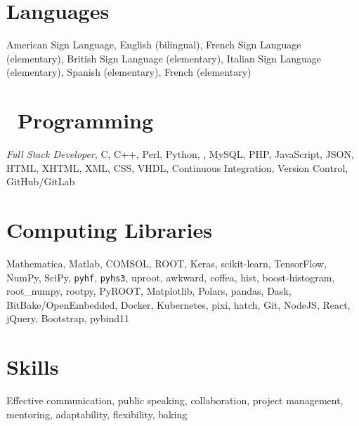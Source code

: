 \documentclass[margin,line]{resume}
\let\origsection\section%
\let\section\subsection%
\let\section\origsection%
\begin{document}
\begin{resume}
\section{\mysidestyle Languages}

American Sign Language, English (bilingual), French Sign Language (elementary), British Sign Language (elementary), Italian Sign Language (elementary), Spanish (elementary), French (elementary)

\section{\mysidestyle {}~Programming}

\textsl{Full Stack Developer}, C, C++, Perl, Python, \LaTeXe, MySQL, PHP, JavaScript, JSON, HTML, XHTML, XML, CSS, VHDL, Continuous Integration, Version Control, GitHub/GitLab

\section{\mysidestyle Computing Libraries}

Mathematica, Matlab, COMSOL, ROOT, Keras, scikit-learn, TensorFlow, NumPy, SciPy, \texttt{pyhf}, \texttt{pyhs3}, uproot, awkward, coffea, hist, boost-histogram, root\_numpy, rootpy, PyROOT, Matplotlib, Polars, pandas, Dask, BitBake/OpenEmbedded, Docker, Kubernetes, pixi, hatch, Git, NodeJS, React, jQuery, Bootstrap, pybind11

\section{\mysidestyle Skills}

Effective communication, public speaking, collaboration, project management, mentoring, adaptability, flexibility, baking

%
%
\end{resume}
\end{document}
